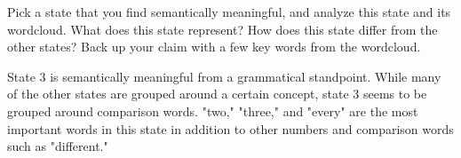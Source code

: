 \indent\problem[5] %
Pick a state that you find semantically meaningful, and analyze this state and its wordcloud. What does this state represent? How does this state differ from the other states? Back up your claim with a few key words from the wordcloud.
\begin{solution}
  State 3 is semantically meaningful from a grammatical standpoint. While many of the other states are grouped around a certain concept, state 3 seems to be grouped around comparison words. "two," "three," and "every" are the most important words in this state in addition to other numbers and comparison words such as "different."
\end{solution}




